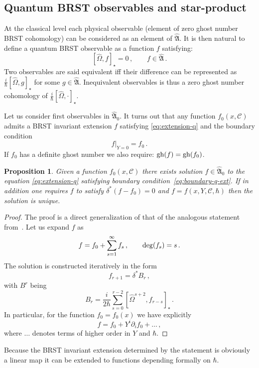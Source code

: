 \documentclass[a4paper,11pt]{amsart}
\newtheorem{prop}[thm]{Proposition}
\numberwithin{thm}{section} %
\numberwithin{equation}{section} %
\numberwithin{figure}{section} %
\newcommand{\qcommut}[2]{[#1,#2]_\star}
\newcommand{\gh}[1]{{\rm gh}(#1)}
\renewcommand{\deg}[1]{{\rm deg}(#1)}
\renewcommand{\:}{{\rm\, :\,}}
\def\d{\partial}
\def\cc{{\mathcal C}}
\def\qA{{\hat{\mathfrak A}}}
\begin{document}
\subsection{Quantum BRST observables and star-product}
At the classical level each physical observable (element of zero ghost
number BRST cohomology) can be considered as an element of $\qA$.
It is then natural to define a quantum BRST observable
as a function $f$ satisfying:
\begin{equation}
\label{eq:extension-q}
  \qcommut{\hat\Omega}{f}=0\,, \qquad f\in \qA\,.
\end{equation}
Two observables are said equivalent iff their difference
can be represented as $\frac{i}{\hbar}\qcommut{\hat\Omega}{g}$
for some $g\in \qA$. Inequivalent observables is thus
a zero ghost number cohomology of
$\frac{i}{\hbar}\qcommut{\hat\Omega}{\cdot}$.


Let us consider first observables in $\qA_0$.  It turns out that any
function $f_0(x,\cc)$ admits a BRST invariant extension $f$
satisfying \eqref{eq:extension-q} and
the boundary condition
\begin{equation}
\label{eq:boundary-q-ext}
  f{\bigr|}_{Y=0}=f_0\,.
\end{equation}
If $f_0$ has a definite ghost number we also
require: $\gh{f}=\gh{f_0}$.
\begin{prop}\label{prop:extension-q}
Given a function $f_0(x,\cc)$ there exists solution
$f\in \qA_0$ to the equation \eqref{eq:extension-q} satisfying
boundary condition~\eqref{eq:boundary-q-ext}.  If in
addition one requires $f$ to satisfy $\delta^*(f-f_0)=0$
and $f=f(x,Y,\cc,\hbar)$ then the solution is unique.
\end{prop}
\begin{proof}
The proof is a direct generalization of that of the analogous
statement from~\cite{[GL]}. Let us expand $f$ as
\begin{equation}
f=f_0+\sum_{s=1}^\infty f_s\,,\qquad \deg{f_s}=s\,.
\end{equation}
The solution is constructed
iteratively in the form
$$
{f}_{r+1}=\delta^*{B}_r\,,
$$
with $B^r$ being
$$
B_r=\frac{i}{2\hbar}\sum_{s=0}^{r-2}
\qcommut{{\hat\Omega}^{s+2}}{f_{r-s}}\,.
$$
In particular, for the function $f_0=f_0(x)$ we
have explicitly
\begin{equation}
  f=f_0+Y^i \d_i f_0 +\ldots\,,
\end{equation}
where $\ldots$ denotes terms of higher order in $Y$ and $\hbar$.
\end{proof}
Because the BRST invariant extension determined by the statement is
obviously a linear map it can be extended to functions
depending formally on $\hbar$.
\end{document}
